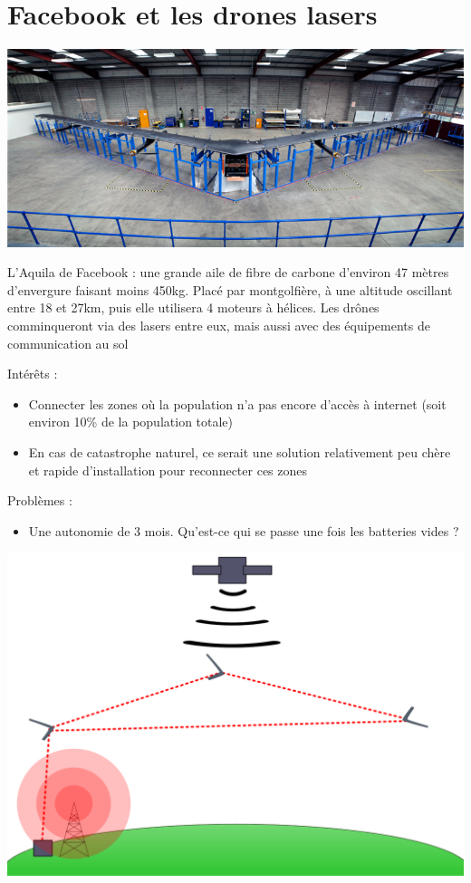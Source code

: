 \documentclass[a4paper,11pt]{report}
\begin{document}
\section{Facebook et les drones lasers}
\begin{flushleft}
\includegraphics[width=\textwidth]{../Images/facebook_aquila.png}
\end{flushleft}
L'Aquila de Facebook : une grande aile de fibre de carbone d'environ 47 mètres d'envergure faisant moins 450kg. Placé par montgolfière, à une altitude oscillant entre 18 et 27km, puis elle utilisera 4 moteurs à hélices. Les drônes comminqueront via des lasers entre eux, mais aussi avec des équipements de communication au sol

Intérêts :
\begin{itemize}
  \item Connecter les zones où la population n'a pas encore d'accès à internet (soit environ 10\% de la population totale)
  \item En cas de catastrophe naturel, ce serait une solution relativement peu chère et rapide d'installation pour reconnecter ces zones
\end{itemize}

Problèmes :
\begin{itemize}
  \item Une autonomie de 3 mois. Qu'est-ce qui se passe une fois les batteries vides ?
\end{itemize}
\includegraphics[width=\textwidth]{../Images/schema_aquila.png}
\end{document}
